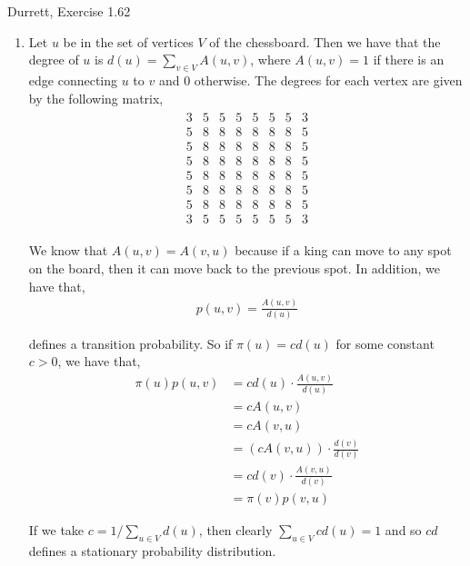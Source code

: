 \documentclass[12pt]{article}
\newenvironment{problem}[2][Problem]{\begin{trivlist}
\item[\hskip \labelsep {\bfseries #1}\hskip \labelsep {\bfseries #2.}]}{\end{trivlist}}
\begin{document}
\begin{problem}{2}
Durrett, Exercise 1.62
\end{problem}

\begin{enumerate}[label=(\alph*)]

\item Let $u$ be in the set of vertices $V$ of the chessboard. Then we have that the degree of $u$ is $d(u) = \sum_{v \in V} A(u, v)$, where $A(u, v) = 1$ if there is an edge connecting $u$ to $v$ and $0$ otherwise. The degrees for each vertex are given by the following matrix,
\begin{align*}
\begin{array}{cccc|cccc}
  3 & 5 & 5 & 5 & 5 & 5 & 5 & 3\\
  5 & 8 & 8 & 8 & 8 & 8 & 8 & 5\\
  5 & 8 & 8 & 8 & 8 & 8 & 8 & 5\\
  5 & 8 & 8 & 8 & 8 & 8 & 8 & 5\\
  \hline
  5 & 8 & 8 & 8 & 8 & 8 & 8 & 5\\
  5 & 8 & 8 & 8 & 8 & 8 & 8 & 5\\
  5 & 8 & 8 & 8 & 8 & 8 & 8 & 5\\
  3 & 5 & 5 & 5 & 5 & 5 & 5 & 3
\end{array}
\end{align*}

We know that $A(u, v) = A(v, u)$ because if a king can move to any spot on the board, then it can move back to the previous spot. In addition, we have that,
\begin{align*}
p(u, v) = \frac{A(u,v)}{d(u)}
\end{align*}

defines a transition probability. So if $\pi(u) = cd(u)$ for some constant $c > 0$, we have that,
\begin{align*}
\pi(u)p(u, v) &= cd(u) \cdot \frac{A(u,v)}{d(u)}\\
&= cA(u,v)\\
&= cA(v, u)\\
&= (cA(v,u)) \cdot \frac{d(v)}{d(v)}\\
&= cd(v) \cdot \frac{A(v, u)}{d(v)}\\
&= \pi(v) p(v, u)
\end{align*}

If we take $c = 1/\sum_{u \in V} d(u)$, then clearly $\sum_{u \in V} cd(u) = 1$ and so $cd$ defines a stationary probability distribution.\\


\end{enumerate}
\end{document}
